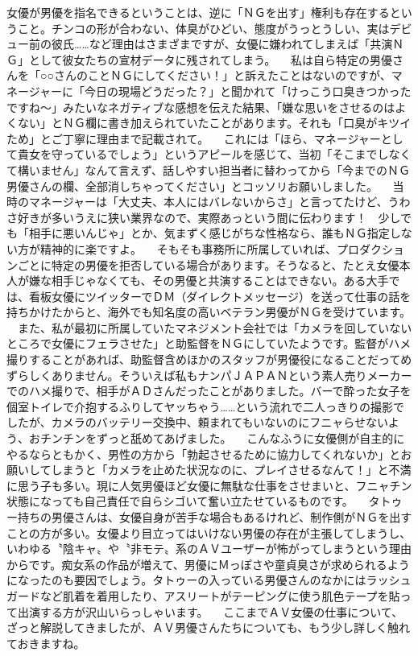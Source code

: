 \documentclass[12pt,UTF8]{ctexbook}
\begin{document}
女優が男優を指名できるということは、逆に「ＮＧを出す」権利も存在するということ。チンコの形が合わない、体臭がひどい、態度がうっとうしい、実はデビュー前の彼氏……など理由はさまざまですが、女優に嫌われてしまえば「共演ＮＧ」として彼女たちの宣材データに残されてしまう。
　私は自ら特定の男優さんを「○○さんのことＮＧにしてください！」と訴えたことはないのですが、マネージャーに「今日の現場どうだった？」と聞かれて「けっこう口臭きつかったですね〜」みたいなネガティブな感想を伝えた結果、「嫌な思いをさせるのはよくない」とＮＧ欄に書き加えられていたことがあります。それも「口臭がキツイため」とご丁寧に理由まで記載されて。
　これには「ほら、マネージャーとして貴女を守っているでしょう」というアピールを感じて、当初「そこまでしなくて構いません」なんて言えず、話しやすい担当者に替わってから「今までのＮＧ男優さんの欄、全部消しちゃってください」とコッソリお願いしました。
　当時のマネージャーは「大丈夫、本人にはバレないからさ」と言ってたけど、うわさ好きが多いうえに狭い業界なので、実際あっという間に伝わります！　少しでも「相手に悪いんじゃ」とか、気まずく感じがちな性格なら、誰もＮＧ指定しない方が精神的に楽ですよ。
　そもそも事務所に所属していれば、プロダクションごとに特定の男優を拒否している場合があります。そうなると、たとえ女優本人が嫌な相手じゃなくても、その男優と共演することはできない。ある大手では、看板女優にツイッターでＤＭ（ダイレクトメッセージ）を送って仕事の話を持ちかけたからと、海外でも知名度の高いベテラン男優がＮＧを受けています。
　また、私が最初に所属していたマネジメント会社では「カメラを回していないところで女優にフェラさせた」と助監督をＮＧにしていたようです。監督がハメ撮りすることがあれば、助監督含めほかのスタッフが男優役になることだってめずらしくありません。そういえば私もナンパＪＡＰＡＮという素人売りメーカーでのハメ撮りで、相手がＡＤさんだったことがありました。バーで酔った女子を個室トイレで介抱するふりしてヤッちゃう……という流れで二人っきりの撮影でしたが、カメラのバッテリー交換中、頼まれてもいないのにフニャらせないよう、おチンチンをずっと舐めてあげました。
　こんなふうに女優側が自主的にやるならともかく、男性の方から「勃起させるために協力してくれないか」とお願いしてしまうと「カメラを止めた状況なのに、プレイさせるなんて！」と不満に思う子も多い。現に人気男優ほど女優に無駄な仕事をさせまいと、フニャチン状態になっても自己責任で自らシゴいて奮い立たせているものです。
　タトゥー持ちの男優さんは、女優自身が苦手な場合もあるけれど、制作側がＮＧを出すことの方が多い。女優より目立ってはいけない男優の存在が主張してしまうし、いわゆる〝陰キャ〟や〝非モテ〟系のＡＶユーザーが怖がってしまうという理由からです。痴女系の作品が増えて、男優にＭっぽさや童貞臭さが求められるようになったのも要因でしょう。タトゥーの入っている男優さんのなかにはラッシュガードなど肌着を着用したり、アスリートがテーピングに使う肌色テープを貼って出演する方が沢山いらっしゃいます。
　ここまでＡＶ女優の仕事について、ざっと解説してきましたが、ＡＶ男優さんたちについても、もう少し詳しく触れておきますね。
\end{document}
